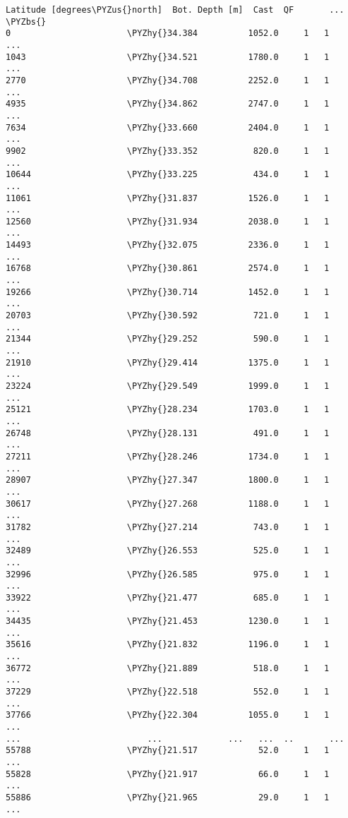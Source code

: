 \documentclass[a4paper,11pt,final]{article}
\def\PYZbs{\char`\\}
\def\PYZus{\char`\_}
\def\PYZhy{\char`\-}
\begin{document}
\begin{Verbatim}[commandchars=\\\{\},frame=leftline,fontsize=\small, xleftmargin=0.5em]
       Latitude [degrees\PYZus{}north]  Bot. Depth [m]  Cast  QF       ...
\PYZbs{}
0                       \PYZhy{}34.384          1052.0     1   1       ...
1043                    \PYZhy{}34.521          1780.0     1   1       ...
2770                    \PYZhy{}34.708          2252.0     1   1       ...
4935                    \PYZhy{}34.862          2747.0     1   1       ...
7634                    \PYZhy{}33.660          2404.0     1   1       ...
9902                    \PYZhy{}33.352           820.0     1   1       ...
10644                   \PYZhy{}33.225           434.0     1   1       ...
11061                   \PYZhy{}31.837          1526.0     1   1       ...
12560                   \PYZhy{}31.934          2038.0     1   1       ...
14493                   \PYZhy{}32.075          2336.0     1   1       ...
16768                   \PYZhy{}30.861          2574.0     1   1       ...
19266                   \PYZhy{}30.714          1452.0     1   1       ...
20703                   \PYZhy{}30.592           721.0     1   1       ...
21344                   \PYZhy{}29.252           590.0     1   1       ...
21910                   \PYZhy{}29.414          1375.0     1   1       ...
23224                   \PYZhy{}29.549          1999.0     1   1       ...
25121                   \PYZhy{}28.234          1703.0     1   1       ...
26748                   \PYZhy{}28.131           491.0     1   1       ...
27211                   \PYZhy{}28.246          1734.0     1   1       ...
28907                   \PYZhy{}27.347          1800.0     1   1       ...
30617                   \PYZhy{}27.268          1188.0     1   1       ...
31782                   \PYZhy{}27.214           743.0     1   1       ...
32489                   \PYZhy{}26.553           525.0     1   1       ...
32996                   \PYZhy{}26.585           975.0     1   1       ...
33922                   \PYZhy{}21.477           685.0     1   1       ...
34435                   \PYZhy{}21.453          1230.0     1   1       ...
35616                   \PYZhy{}21.832          1196.0     1   1       ...
36772                   \PYZhy{}21.889           518.0     1   1       ...
37229                   \PYZhy{}22.518           552.0     1   1       ...
37766                   \PYZhy{}22.304          1055.0     1   1       ...
...                         ...             ...   ...  ..       ...
55788                   \PYZhy{}21.517            52.0     1   1       ...
55828                   \PYZhy{}21.917            66.0     1   1       ...
55886                   \PYZhy{}21.965            29.0     1   1       ...

\end{Verbatim}
\end{document}
